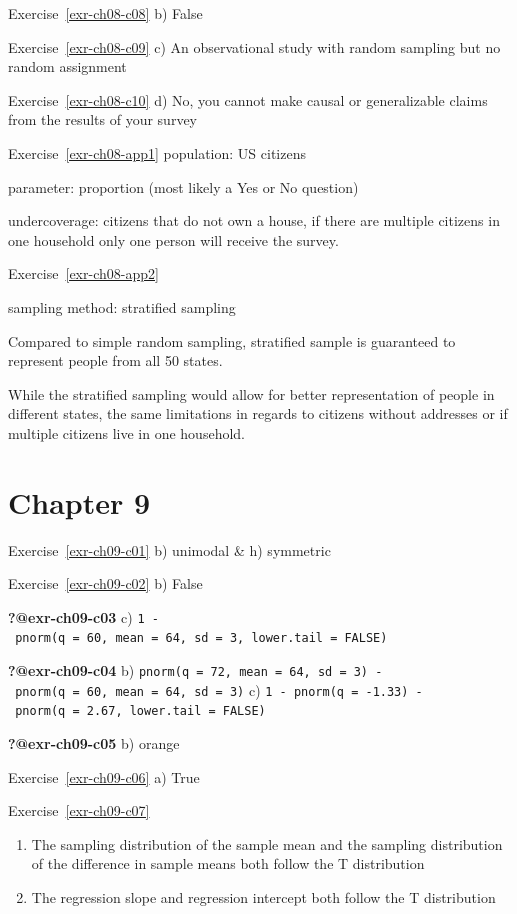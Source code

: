 \documentclass[
  letterpaper,
  DIV=11,
  numbers=noendperiod]{scrreprt}
\theoremstyle{definition}
\theoremstyle{remark}
\begin{document}
Exercise~\ref{exr-ch08-c08} b) False

Exercise~\ref{exr-ch08-c09} c) An observational study with random
sampling but no random assignment

Exercise~\ref{exr-ch08-c10} d) No, you cannot make causal or
generalizable claims from the results of your survey

Exercise~\ref{exr-ch08-app1} population: US citizens

parameter: proportion (most likely a Yes or No question)

undercoverage: citizens that do not own a house, if there are multiple
citizens in one household only one person will receive the survey.

Exercise~\ref{exr-ch08-app2}

sampling method: stratified sampling

Compared to simple random sampling, stratified sample is guaranteed to
represent people from all 50 states.

While the stratified sampling would allow for better representation of
people in different states, the same limitations in regards to citizens
without addresses or if multiple citizens live in one household.

\hypertarget{sec-ex09-sol}{%
\section{Chapter 9}\label{sec-ex09-sol}}

Exercise~\ref{exr-ch09-c01} b) unimodal \& h) symmetric

Exercise~\ref{exr-ch09-c02} b) False

\textbf{?@exr-ch09-c03} c)
\texttt{1\ -\ pnorm(q\ =\ 60,\ mean\ =\ 64,\ sd\ =\ 3,\ lower.tail\ =\ FALSE)}

\textbf{?@exr-ch09-c04} b)
\texttt{pnorm(q\ =\ 72,\ mean\ =\ 64,\ sd\ =\ 3)\ -\ pnorm(q\ =\ 60,\ mean\ =\ 64,\ sd\ =\ 3)}
c)
\texttt{1\ -\ pnorm(q\ =\ -1.33)\ -\ pnorm(q\ =\ 2.67,\ lower.tail\ =\ FALSE)}

\textbf{?@exr-ch09-c05} b) orange

Exercise~\ref{exr-ch09-c06} a) True

Exercise~\ref{exr-ch09-c07}

\begin{enumerate}
\def\labelenumi{\alph{enumi})}
\setcounter{enumi}{3}
\item
  The sampling distribution of the sample mean and the sampling
  distribution of the difference in sample means both follow the T
  distribution
\item
  The regression slope and regression intercept both follow the T
  distribution
\end{enumerate}
\end{document}
